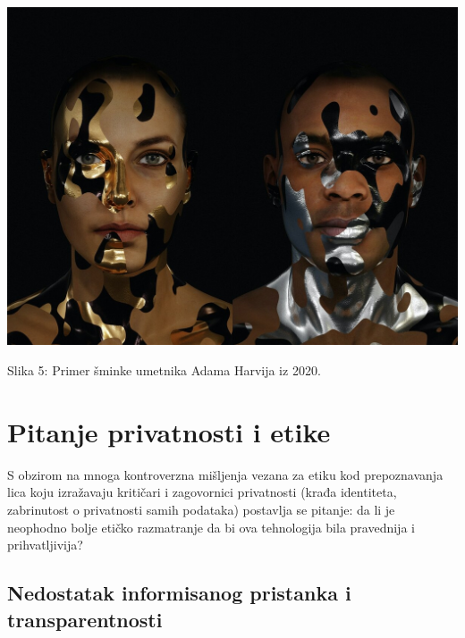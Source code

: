 \documentclass{article}
\begin{document}
\begin{center}
\begin{minipage}{0.5\textwidth}
\includegraphics[width=\textwidth]{sminka2.jpg}
\end{minipage}

\vspace{0.5cm}

Slika 5: Primer šminke umetnika Adama Harvija iz 2020.
\end{center}

\section{Pitanje privatnosti i etike}

S obzirom na mnoga kontroverzna mišljenja vezana za etiku kod prepoznavanja lica koju izražavaju kritičari i zagovornici privatnosti (krađa identiteta, zabrinutost o privatnosti samih podataka) postavlja se pitanje: da li je neophodno bolje etičko razmatranje da bi ova tehnologija bila pravednija i prihvatljivija?

\subsection{Nedostatak informisanog pristanka i transparentnosti}
\end{document}
